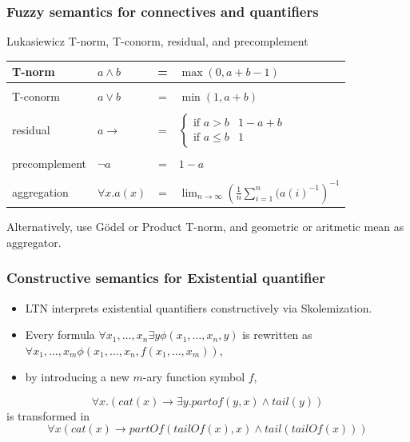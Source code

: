 \documentclass[xcolor=pdftex,dvipsnames,table]{beamer}
\def\imp{\rightarrow}
\begin{document}
\begin{frame}
\frametitle{Fuzzy semantics for connectives and quantifiers}
\begin{block}{L{}ukasiewicz T-norm, T-conorm, residual, and precomplement}
\begin{tabular}{llcl}
\color{blue}T-norm & $a\wedge b$ & = & $\max(0,a+b-1)$ \\ \hline \\
\color{blue}T-conorm & $a\vee b$ & = & $\min(1,a+b)$ \\ \\
\color{blue}residual & $a\imp$ &  = & $\left\{
                              \begin{array}{ll} 
                                \mbox{if } a > b & 1-a+b \\ 
                                \mbox{if }a\leq b & 1 
                              \end{array}\right.$ \\ \\
\color{blue}precomplement & $\neg a$ &  = & $1-a$ \\ \\ 
\color{blue}aggregation & $\forall x. a(x)$ & = & 
  $\lim_{n\rightarrow\infty}\left(\frac{1}{n}\sum_{i=1}^n(a(i)^{-1}\right)^{-1}$
\end{tabular}
\end{block}
Alternatively, use G\"odel or Product T-norm, and geometric or
aritmetic mean as aggregator.
\end{frame}

\begin{frame}
\frametitle{Constructive semantics for Existential quantifier}
\begin{itemize}
  \item LTN interprets existential quantifiers constructively via
    Skolemization.
  \item Every formula $\forall x_1,\dots,x_n\exists y \phi(x_1,\dots,x_n,y)$ is
rewritten as
$\forall x_1,\dots,x_m\phi(x_1,\dots,x_n,f(x_1,\dots,x_m))$,
\item 
by introducing a new $m$-ary function symbol $f$,
\end{itemize}
\begin{example}
  $$\forall
  x.(cat(x)\rightarrow\exists y.partof(y,x)\wedge tail(y))$$
  is transformed in 
  $$\forall
  x(cat(x)\rightarrow partOf(tailOf(x),x)\wedge tail(tailOf(x)))$$
\end{example}
\end{frame}
\end{document}
